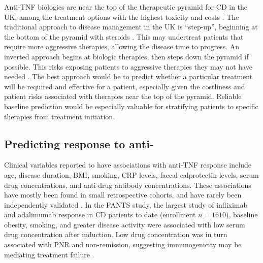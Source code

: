 Anti-\gls{TNF} biologics are near the top of the therapeutic pyramid for \gls{CD} in the UK, among the treatment options with the highest toxicity and costs \autocite{rogler2015WhereAreWe}.
The traditional approach to disease management in the UK is \enquote{step-up}, beginning at the bottom of the pyramid with steroids \autocite{rogler2015WhereAreWe,adegbola2018AntiTNFTherapyCrohn}.
This may undertreat patients that require more aggressive therapies, allowing the disease time to progress.
An inverted approach begins at biologic therapies, then steps down the pyramid if possible.
This risks exposing patients to aggressive therapies they may not have needed \autocite{flamant2018InflammatoryBowelDisease}.
The best approach would be to predict whether a particular treatment will be required and effective for a patient, especially given the costliness and patient risks associated with therapies near the top of the pyramid.
Reliable baseline prediction would be especially valuable for stratifying patients to specific therapies from treatment initiation.

\subsection{Predicting response to anti-}
\label{subsec:multiPANTS_intro_predicting_response}

Clinical variables reported to have associations with anti-\gls{TNF} response include age, disease duration, \gls{BMI}, smoking, \gls{CRP} levels, faecal calprotectin levels, serum drug concentrations, and anti-drug antibody concentrations.
These associations have mostly been found in small retrospective cohorts, and have rarely been independently validated \autocite{dhaens2011LondonPositionStatement,ding2016SystematicReviewPredicting,kopylov2016PredictingDurableResponse,flamant2018InflammatoryBowelDisease,digby-bell2019InterrogatingHostImmunity,noor2020PersonalisedMedicineCrohn}.
In the \gls{PANTS} study, the largest study of infliximab and adalimumab response in \gls{CD} patients to date (enrollment $n=1610$),
baseline obesity, smoking, and greater disease activity were associated with low serum drug concentration after induction.
Low drug concentration was in turn associated with \gls{PNR} and non-remission, suggesting immunogenicity may be mediating treatment failure \autocite{kennedy2019PredictorsAntiTNFTreatment}.

